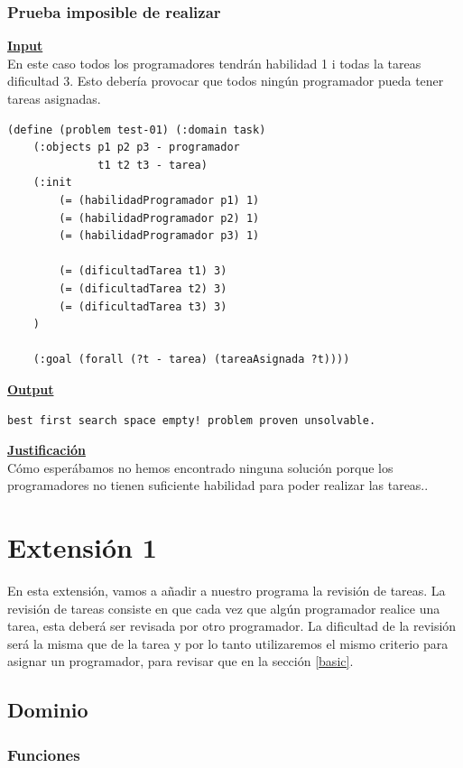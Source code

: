 \documentclass[11pt]{article}
\begin{document}
\subsubsection{Prueba imposible de realizar}
\noindent \underline{\textbf{Input}} \\

En este caso todos los programadores tendrán habilidad 1 i todas la tareas dificultad 3. Esto debería provocar que todos ningún programador pueda tener tareas asignadas.
\medskip
\begin{verbatim}
(define (problem test-01) (:domain task)
    (:objects p1 p2 p3 - programador
			  t1 t2 t3 - tarea)
    (:init
        (= (habilidadProgramador p1) 1)
        (= (habilidadProgramador p2) 1)
        (= (habilidadProgramador p3) 1)
        
        (= (dificultadTarea t1) 3)
        (= (dificultadTarea t2) 3)
        (= (dificultadTarea t3) 3)
    )

    (:goal (forall (?t - tarea) (tareaAsignada ?t))))
\end{verbatim}

\noindent \underline{\textbf{Output}}
\medskip
\begin{verbatim}
best first search space empty! problem proven unsolvable.
\end{verbatim}
\noindent \underline{\textbf{Justificación}} \\

Cómo esperábamos no hemos encontrado ninguna solución porque los programadores no tienen suficiente habilidad para poder realizar las tareas..
\medskip

\newpage
\section{Extensión 1}

En esta extensión, vamos a añadir a nuestro programa la revisión de tareas.
La revisión de tareas consiste en que cada vez que algún programador realice una tarea, esta deberá ser revisada por otro programador. La dificultad de la revisión será la misma que de la tarea y por lo tanto utilizaremos el mismo criterio para asignar un programador, para revisar que en la sección \ref{basic}.

\subsection{Dominio}
\subsubsection{Funciones}
\end{document}
